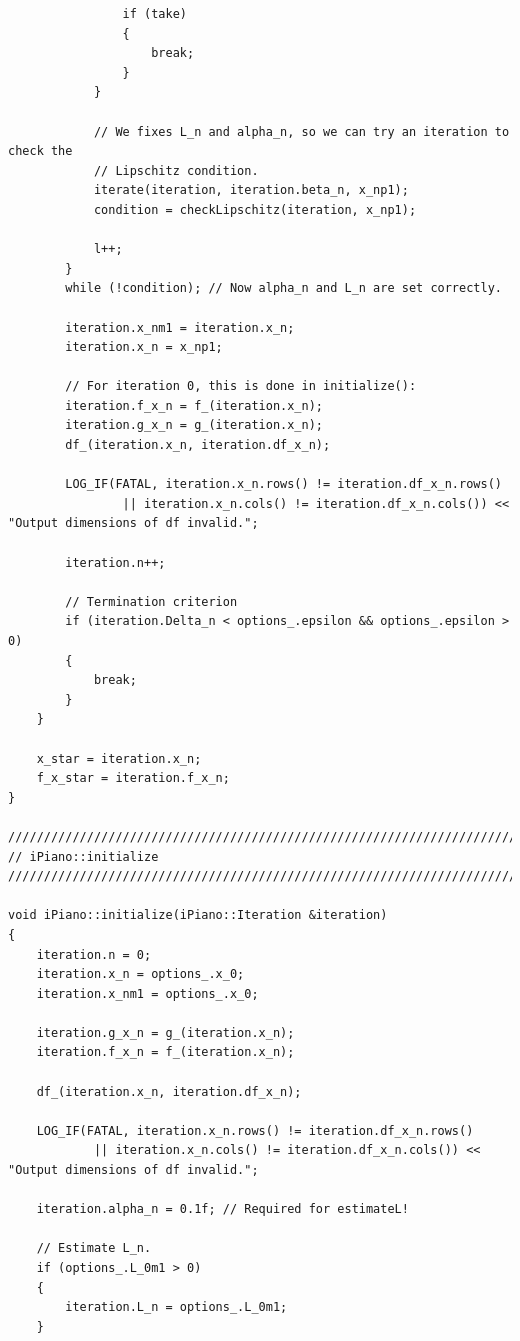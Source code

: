 \documentclass[onecolumn,final,a4paper,13pt,reqno]{siamart}
\begin{document}
\begin{appendix}
\begin{lstlisting}
                if (take)
                {
                    break;
                }
            }
                
            // We fixes L_n and alpha_n, so we can try an iteration to check the
            // Lipschitz condition.
            iterate(iteration, iteration.beta_n, x_np1);
            condition = checkLipschitz(iteration, x_np1);
            
            l++;
        }
        while (!condition); // Now alpha_n and L_n are set correctly.
        
        iteration.x_nm1 = iteration.x_n;
        iteration.x_n = x_np1;
        
        // For iteration 0, this is done in initialize():
        iteration.f_x_n = f_(iteration.x_n);
        iteration.g_x_n = g_(iteration.x_n);
        df_(iteration.x_n, iteration.df_x_n);
        
        LOG_IF(FATAL, iteration.x_n.rows() != iteration.df_x_n.rows() 
                || iteration.x_n.cols() != iteration.df_x_n.cols()) << "Output dimensions of df invalid.";
       
        iteration.n++;
        
        // Termination criterion
        if (iteration.Delta_n < options_.epsilon && options_.epsilon > 0)
        {
            break;
        }
    }
    
    x_star = iteration.x_n;
    f_x_star = iteration.f_x_n;
}

////////////////////////////////////////////////////////////////////////////////
// iPiano::initialize
////////////////////////////////////////////////////////////////////////////////

void iPiano::initialize(iPiano::Iteration &iteration)
{
    iteration.n = 0;
    iteration.x_n = options_.x_0;
    iteration.x_nm1 = options_.x_0;
    
    iteration.g_x_n = g_(iteration.x_n);
    iteration.f_x_n = f_(iteration.x_n);
    
    df_(iteration.x_n, iteration.df_x_n);
    
    LOG_IF(FATAL, iteration.x_n.rows() != iteration.df_x_n.rows() 
            || iteration.x_n.cols() != iteration.df_x_n.cols()) << "Output dimensions of df invalid.";
    
    iteration.alpha_n = 0.1f; // Required for estimateL!
    
    // Estimate L_n.
    if (options_.L_0m1 > 0)
    {
        iteration.L_n = options_.L_0m1;
    }
    

\end{lstlisting}
\end{appendix}
\end{document}
